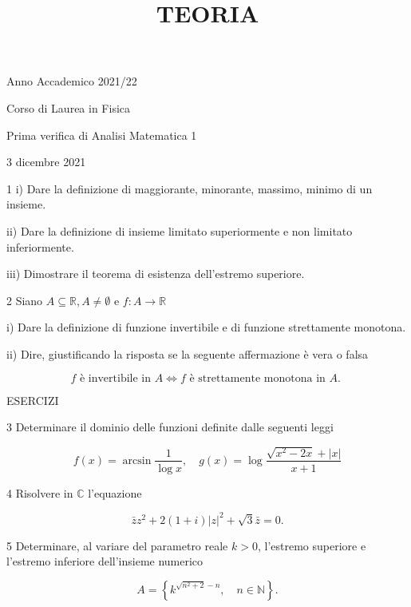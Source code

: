 \documentclass[10pt]{article}
\title{TEORIA }
\author{}
\date{}
\begin{document}
\maketitle
Anno Accademico 2021/22

Corso di Laurea in Fisica

Prima verifica di Analisi Matematica 1

3 dicembre 2021

1 i) Dare la definizione di maggiorante, minorante, massimo, minimo di un insieme.

ii) Dare la definizione di insieme limitato superiormente e non limitato inferiormente.

iii) Dimostrare il teorema di esistenza dell'estremo superiore.

2 Siano \(A \subseteq \mathbb{R}, A \neq \emptyset\) e \(f: A \rightarrow \mathbb{R}\)

i) Dare la definizione di funzione invertibile e di funzione strettamente monotona.

ii) Dire, giustificando la risposta se la seguente affermazione è vera o falsa

\[
f \text { è invertibile in } A \Longleftrightarrow f \text { è strettamente monotona in } A \text {. }
\]

ESERCIZI

3 Determinare il dominio delle funzioni definite dalle seguenti leggi

\[
f(x)=\arcsin \frac{1}{\log x}, \quad g(x)=\log \frac{\sqrt{x^{2}-2 x}+|x|}{x+1}
\]

4 Risolvere in \(\mathbb{C}\) l'equazione

\[
\bar{z} z^{2}+2(1+i)|z|^{2}+\sqrt{3} \bar{z}=0 .
\]

5 Determinare, al variare del parametro reale \(k>0\), l'estremo superiore e l'estremo inferiore dell'insieme numerico

\[
A=\left\{k^{\sqrt{n^{2}+2}-n}, \quad n \in \mathbb{N}\right\} .
\]
\end{document}

